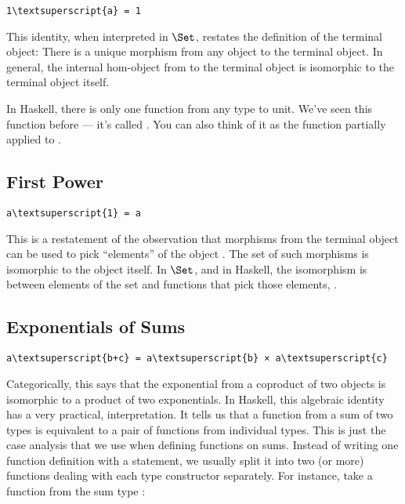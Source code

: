 \begin{Verbatim}[commandchars=\\\{\}]
1\textsuperscript{a} = 1
\end{Verbatim}
This identity, when interpreted in $\Set$, restates the definition
of the terminal object: There is a unique morphism from any object to
the terminal object. In general, the internal hom-object from 
to the terminal object is isomorphic to the terminal object itself.

In Haskell, there is only one function from any type  to unit.
We've seen this function before --- it's called . You can
also think of it as the function  partially applied to
\code{()}.

\subsection{First Power}\label{first-power}

\begin{Verbatim}[commandchars=\\\{\}]
a\textsuperscript{1} = a
\end{Verbatim}
This is a restatement of the observation that morphisms from the
terminal object can be used to pick ``elements'' of the object
. The set of such morphisms is isomorphic to the object
itself. In $\Set$, and in Haskell, the isomorphism is between
elements of the set  and functions that pick those elements,
.

\subsection{Exponentials of Sums}\label{exponentials-of-sums}

\begin{Verbatim}[commandchars=\\\{\}]
a\textsuperscript{b+c} = a\textsuperscript{b} × a\textsuperscript{c}
\end{Verbatim}
Categorically, this says that the exponential from a coproduct of two
objects is isomorphic to a product of two exponentials. In Haskell, this
algebraic identity has a very practical, interpretation. It tells us
that a function from a sum of two types is equivalent to a pair of
functions from individual types. This is just the case analysis that we
use when defining functions on sums. Instead of writing one function
definition with a  statement, we usually split it into two
(or more) functions dealing with each type constructor separately. For
instance, take a function from the sum type
:

